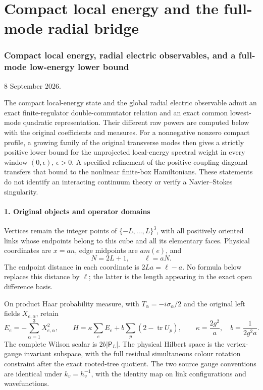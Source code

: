 \documentclass[
  11pt,
]{article}
\begin{document}
\clearpage
\part{Compact local energy and the full-mode radial bridge}
\section{Compact local energy, radial electric observables, and a
full-mode low-energy lower
bound}\label{weak-coupling-part-10-compact-local-energy-radial-electric-observables-and-a-full-mode-low-energy-lower-bound}

8 September 2026.

The compact local-energy state and the global radial electric observable
admit an exact finite-regulator double-commutator relation and an exact
common lowest-mode quadratic representation. Their different raw powers
are computed below with the original coefficients and measures. For a
nonnegative nonzero compact profile, a growing family of the original
transverse modes then gives a strictly positive lower bound for the
unprojected local-energy spectral weight in every window
\((0,\epsilon)\), \(\epsilon>0\). A specified refinement of the
positive-coupling diagonal transfers that bound to the nonlinear
finite-box Hamiltonians. These statements do not identify an interacting
continuum theory or verify a Navier--Stokes singularity.

\subsection{1. Original objects and operator
domains}\label{weak-coupling-part-10-original-objects-and-operator-domains}

Vertices remain the integer points of \(\{-L,\ldots,L\}^3\), with all
positively oriented links whose endpoints belong to this cube and all
its elementary faces. Physical coordinates are \(x=an\), edge midpoints
are \(am(e)\), and \[
 N=2L+1,\qquad \ell=aN.
\] The endpoint distance in each coordinate is \(2La=\ell-a\). No
formula below replaces this distance by \(\ell\); the latter is the
length appearing in the exact open difference basis.

On product Haar probability measure, with \(T_\alpha=-i\sigma_\alpha/2\)
and the original left fields \(X_{e,\alpha}\), retain \[
 E_e=-\sum_{\alpha=1}^3X_{e,\alpha}^2,\qquad
 H=\kappa\sum_eE_e+b\sum_p(2-\operatorname{tr}U_p),\qquad
 \kappa=\frac{2g^2}{a},\quad b=\frac1{2g^2a}.
\tag{A1}
\] The complete Wilson scalar is \(2b|\mathsf P_L|\). The physical
Hilbert space is the vertex-gauge invariant subspace, with the full
residual simultaneous colour rotation constraint after the exact
rooted-tree quotient. The two source gauge conventions are identical
under \(k_v=h_v^{-1}\), with the identity map on link configurations and
wavefunctions.
\end{document}
